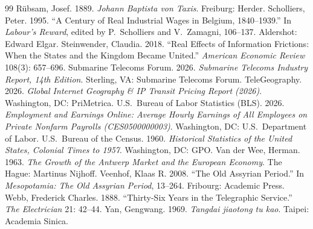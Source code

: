 \documentclass[11pt,a4paper]{article}
\begin{document}
\begin{thebibliography}{99}
 R\"ubsam, Josef. 1889. \textit{Johann Baptista von Taxis}. Freiburg: Herder.
 Scholliers, Peter. 1995. ``A Century of Real Industrial Wages in Belgium, 1840--1939.'' In \textit{Labour's Reward}, edited by P.\ Scholliers and V.\ Zamagni, 106--137. Aldershot: Edward Elgar.
 Steinwender, Claudia. 2018. ``Real Effects of Information Frictions: When the States and the Kingdom Became United.'' \textit{American Economic Review} 108(3): 657--696.
 Submarine Telecoms Forum. 2026. \textit{Submarine Telecoms Industry Report, 14th Edition}. Sterling, VA: Submarine Telecoms Forum.
 TeleGeography. 2026. \textit{Global Internet Geography \& IP Transit Pricing Report (2026)}. Washington, DC: PriMetrica.
 U.S.\ Bureau of Labor Statistics (BLS). 2026. \textit{Employment and Earnings Online: Average Hourly Earnings of All Employees on Private Nonfarm Payrolls (CES0500000003)}. Washington, DC: U.S.\ Department of Labor.
 U.S.\ Bureau of the Census. 1960. \textit{Historical Statistics of the United States, Colonial Times to 1957}. Washington, DC: GPO.
 Van der Wee, Herman. 1963. \textit{The Growth of the Antwerp Market and the European Economy}. The Hague: Martinus Nijhoff.
 Veenhof, Klaas R. 2008. ``The Old Assyrian Period.'' In \textit{Mesopotamia: The Old Assyrian Period}, 13--264. Fribourg: Academic Press.
 Webb, Frederick Charles. 1888. ``Thirty-Six Years in the Telegraphic Service.'' \textit{The Electrician} 21: 42--44.
 Yan, Gengwang. 1969. \textit{Tangdai jiaotong tu kao}. Taipei: Academia Sinica.
\end{thebibliography}
\end{document}
